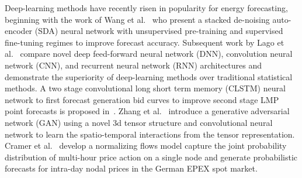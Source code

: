 Deep-learning methods have recently risen in popularity for energy forecasting, beginning with the work of
Wang et al.~\cite{7744689} who present a stacked de-noising auto-encoder (SDA) neural network with unsupervised
pre-training and supervised fine-tuning regimes to improve forecast accuracy.
Subsequent work by Lago et al.~\cite{LAGO2018386} compare novel deep feed-forward neural network (DNN),
convolution neural network (CNN), and recurrent neural network (RNN) architectures and demonstrate the superiority of
deep-learning methods over traditional statistical methods.
A two stage convolutional long short term memory (CLSTM) neural network to first
forecast generation bid curves to improve second stage LMP point forecasts is proposed in~\cite{9916722}.
Zhang et al.~\cite{9520248} introduce a generative adversarial network (GAN) using a novel 3d tensor structure and
convolutional neural network to learn the spatio-temporal interactions from the tensor representation.
Cramer et al.~\cite{48550} develop a normalizing flows model capture the joint probability distribution of multi-hour price
action on a single node and generate probabilistic forecasts for intra-day nodal prices in the German EPEX spot market.

